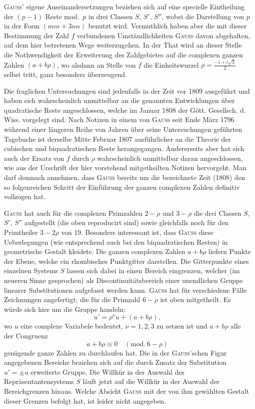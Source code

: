 \textsc{Gauss}' eigene Auseinandersetzungen beziehen sich auf eine specielle Eintheilung der
$(p-1)$ Reste mod.\ $p$ in drei Classen $S$, $S'$, $S''$, wobei die Darstellung von $p$ in der
Form $(mm+3nn)$ benutzt wird. Vermuthlich haben aber die mit dieser Bestimmung der Zahl $f$
verbundenen Umständlichkeiten \textsc{Gauss} davon abgehalten, auf dem hier betretenen Wege
weiterzugehen. In der That wird an dieser Stelle die Nothwendigkeit der Erweiterung des
Zahlgebietes auf die complexen ganzen Zahlen $(a+b\rho)$, wo alsdann an Stelle von $f$ die
Einheitswurzel
$\rho = \frac{-1+i\sqrt{3}}{2}$
selbst tritt, ganz besonders überzeugend.

Die fraglichen Untersuchungen sind jedenfalls in der Zeit vor 1809 ausgeführt und haben sich
wahrscheinlich unmittelbar an die genannten Entwicklungen über quadratische Reste angeschlossen,
welche im Januar 1808 der Gött. Gesellsch. d. Wiss. vorgelegt sind. Nach Notizen in einem von
\textsc{Gauss} seit Ende März 1796 während einer längeren Reihe von Jahren über seine
Untersuchungen geführten Tagebuche ist derselbe Mitte Februar 1807
ausführlicher an die Theorie der cubischen und biquadratischen Reste herangegangen. Andererseits
aber hat sich auch der Ersatz von $f$ durch $\rho$ wahrscheinlich unmittelbar daran
angeschlossen, wie aus der Urschrift der hier vorstehend mitgetheilten Notizen hervorgeht. Man
darf demnach annehmen, dass \textsc{Gauss} bereits um die bezeichnete Zeit (1808) den so
folgenreichen Schritt der Einführung der ganzen complexen Zahlen definitiv vollzogen hat.

\textsc{Gauss} hat auch für die complexen Primzahlen $2-\rho$ und $3-\rho$ die drei Classen $S$,
$S'$, $S''$ aufgestellt (die oben reproducirt sind) sowie gleichfalls noch für den Primtheiler
$3-2\rho$ von 19. Besonders interessant ist, dass \textsc{Gauss} diese Ueberlegungen (wie
entsprechend auch bei den biquadratischen Resten) in geometrische Gestalt kleidete. Die ganzen
complexen Zahlen $a+b\rho$ liefern Punkte der Ebene, welche ein rhombisches Punktgitter
darstellen. Die Gitterpunkte eines einzelnen Systems $S$ lassen sich dabei in einen Bereich
eingrenzen, welcher (im neueren Sinne gesprochen) als Discontinuitätsbereich einer unendlichen
Gruppe linearer Substitutionen aufgefasst werden kann. \textsc{Gauss} hat für verschiedene Fälle
Zeichnungen angefertigt; die für die Primzahl $6-\rho$ ist oben mitgetheilt. Es würde sich hier
um die Gruppe handeln:
\[
u' = \rho^{\nu} u + (a+b\rho),
\]
wo $u$ eine complexe Variabele bedeutet, $\nu = 1, 2, 3$ zu setzen ist und $a+b\rho$ alle der
Congruenz
\[
a+b\rho \equiv 0 \quad(\mathrm{mod.}\ 6-\rho)
\]
genügende ganze Zahlen zu durchlaufen hat. Die in der \textsc{Gauss}'schen Figur angegebenen
Bereiche beziehen sich auf die durch Zusatz der Substitution $u' = \pm u$ erweiterte Gruppe, Die
Willkür
in der Auswahl des Repräsentantensystems $S$ läuft jetzt auf die Willkür in der Auswahl der
Bereichgrenzen hinaus. Welche Absicht \textsc{Gauss} mit der von ihm gewählten Gestalt dieser
Grenzen befolgt hat, ist leider nicht angegeben.

